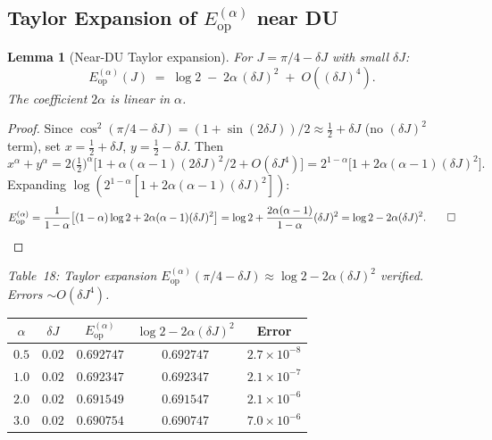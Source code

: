 \documentclass[12pt,a4paper]{article}
\newtheorem{lemma}[theorem]{Lemma}
\begin{document}
\subsection{Taylor Expansion of $E^{(\alpha)}_\mathrm{op}$ near DU}

\begin{lemma}[Near-DU Taylor expansion]\label{lem:eop_taylor_alpha}
For $J = \pi/4 - \delta J$ with small $\delta J$:
\begin{equation}\label{eq:eop_taylor_alpha}
  E^{(\alpha)}_\mathrm{op}(J)
  \;=\; \log 2 \;-\; 2\alpha\,(\delta J)^2 \;+\; O((\delta J)^4).
\end{equation}
The coefficient $2\alpha$ is \emph{linear in $\alpha$}.
\end{lemma}

\begin{proof}
Since $\cos^2(\pi/4-\delta J) = (1+\sin(2\delta J))/2 \approx \tfrac{1}{2}+\delta J$
(no $(\delta J)^2$ term), set $x=\tfrac{1}{2}+\delta J$, $y=\tfrac{1}{2}-\delta J$.
Then
\[
  x^\alpha + y^\alpha
  = 2\bigl(\tfrac{1}{2}\bigr)^\alpha\bigl[1 + \alpha(\alpha-1)(2\delta J)^2/2 + O(\delta J^4)\bigr]
  = 2^{1-\alpha}\bigl[1 + 2\alpha(\alpha-1)(\delta J)^2\bigr].
\]
Expanding $\log(2^{1-\alpha}[1+2\alpha(\alpha-1)(\delta J)^2])$:
\[
  E^{(\alpha)}_\mathrm{op} = \frac{1}{1-\alpha}\!\left[(1-\alpha)\log 2 + 2\alpha(\alpha-1)(\delta J)^2\right]
  = \log 2 + \frac{2\alpha(\alpha-1)}{1-\alpha}(\delta J)^2
  = \log 2 - 2\alpha(\delta J)^2.\qed
\]
\end{proof}

\noindent\textit{Table~18: Taylor expansion $E^{(\alpha)}_\mathrm{op}(\pi/4-\delta J)
\approx\log 2 - 2\alpha(\delta J)^2$ verified. Errors $\sim O(\delta J^4)$.}

\begin{center}
\begin{tabular}{@{}ccccc@{}}
\toprule
$\alpha$ & $\delta J$ & $E^{(\alpha)}_\mathrm{op}$ & $\log 2-2\alpha(\delta J)^2$ & Error\\
\midrule
$0.5$ & $0.02$ & $0.692747$ & $0.692747$ & $2.7\times10^{-8}$\\
$1.0$ & $0.02$ & $0.692347$ & $0.692347$ & $2.1\times10^{-7}$\\
$2.0$ & $0.02$ & $0.691549$ & $0.691547$ & $2.1\times10^{-6}$\\
$3.0$ & $0.02$ & $0.690754$ & $0.690747$ & $7.0\times10^{-6}$\\
\bottomrule
\end{tabular}
\end{center}
\end{document}
